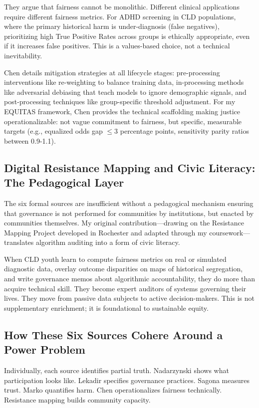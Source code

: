 \documentclass[12pt,a4paper]{article}
\begin{document}
They argue that fairness cannot be monolithic. Different clinical applications require different fairness metrics. For ADHD screening in CLD populations, where the primary historical harm is under-diagnosis (false negatives), prioritizing high True Positive Rates across groups is ethically appropriate, even if it increases false positives. This is a values-based choice, not a technical inevitability.

Chen details mitigation strategies at all lifecycle stages: pre-processing interventions like re-weighting to balance training data, in-processing methods like adversarial debiasing that teach models to ignore demographic signals, and post-processing techniques like group-specific threshold adjustment. For my EQUITAS framework, Chen provides the technical scaffolding making justice operationalizable: not vague commitment to fairness, but specific, measurable targets (e.g., equalized odds gap $\leq 3$ percentage points, sensitivity parity ratios between 0.9-1.1).

\subsection{Digital Resistance Mapping and Civic Literacy: The Pedagogical Layer}

The six formal sources are insufficient without a pedagogical mechanism ensuring that governance is not performed for communities by institutions, but enacted by communities themselves. My original contribution---drawing on the Resistance Mapping Project developed in Rochester and adapted through my coursework---translates algorithm auditing into a form of civic literacy.

When CLD youth learn to compute fairness metrics on real or simulated diagnostic data, overlay outcome disparities on maps of historical segregation, and write governance memos about algorithmic accountability, they do more than acquire technical skill. They become expert auditors of systems governing their lives. They move from passive data subjects to active decision-makers. This is not supplementary enrichment; it is foundational to sustainable equity.

\subsection{How These Six Sources Cohere Around a Power Problem}

Individually, each source identifies partial truth. Nadarzynski shows what participation looks like. Lekadir specifies governance practices. Sagona measures trust. Marko quantifies harm. Chen operationalizes fairness technically. Resistance mapping builds community capacity.
\end{document}
